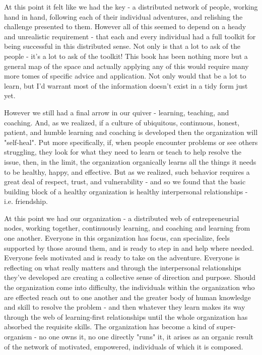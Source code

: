 \documentclass[11pt]{book}
\begin{document}
At this point it felt like we had the key - a distributed network of people, working hand in hand, following each of their individual adventures, and relishing the challenge presented to them. However all of this seemed to depend on a heady and unrealistic requirement - that each and every individual had a full toolkit for being successful in this distributed sense. Not only is that a lot to ask of the people - it's a lot to ask of the toolkit! This book has been nothing more but a general map of the space and actually applying any of this would require many more tomes of specific advice and application. Not only would that be a lot to learn, but I'd warrant most of the information doesn't exist in a tidy form just yet. 
\newline

However we still had a final arrow in our quiver - learning, teaching, and coaching. And, as we realized, if a culture of ubiquitous, continuous, honest, patient, and humble learning and coaching is developed then the organization will "self-heal". Put more specifically, if, when people encounter problems or see others struggling, they look for what they need to learn or teach to help resolve the issue, then, in the limit, the organization organically learns all the things it needs to be healthy, happy, and effective. But as we realized, such behavior requires a great deal of respect, trust, and vulnerability - and so we found that the basic building block of a healthy organization is healthy interpersonal relationships - i.e. friendship.
\newline

At this point we had our organization - a distributed web of entrepreneurial nodes, working together, continuously learning, and coaching and learning from one another. Everyone in this organization has focus, can specialize, feels supported by those around them, and is ready to step in and help where needed. Everyone feels motivated and is ready to take on the adventure. Everyone is reflecting on what really matters and through the interpersonal relationships they've developed are creating a collective sense of direction and purpose. Should the organization come into difficulty, the individuals within the organization who are effected reach out to one another and the greater body of human knowledge and skill to resolve the problem - and then whatever they learn makes its way through the web of learning-first relationships until the whole organization has absorbed the requisite skills. The organization has become a kind of super-organism - no one owns it, no one directly "runs" it, it arises as an organic result of the network of motivated, empowered, individuals of which it is composed. 
\newline
\end{document}
